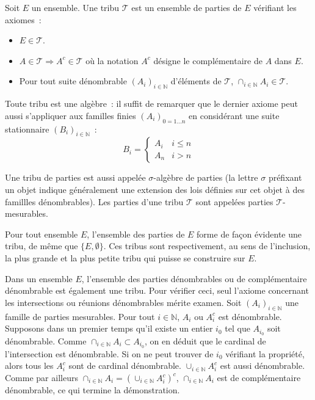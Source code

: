 \begin{mandatory}
\begin{defn}
Soit $E$ un ensemble. Une tribu $\mathcal{T}$ est un
ensemble de parties de $E$ vérifiant les axiomes~:
\begin{itemize}
\item $E \in \mathcal{T}$.
\item $A \in \mathcal{T} \Rightarrow A^c \in \mathcal{T}$ où la
  notation $A^c$ désigne le complémentaire de $A$ dans $E$.
\item Pour tout suite dénombrable $(A_i)_{i \in \mathbb{N}}$ d'éléments de
  $\mathcal{T}$, $\cap_{i \in \mathbb{N}}  A_i \in \mathcal{T}$.
\end{itemize}
\end{defn}
\end{mandatory}
Toute tribu est une algèbre~: il suffit de  remarquer que le dernier
axiome peut aussi s'appliquer aux familles finies $(A_i)_{0=1\dots n}$
en considérant une suite stationnaire $(B_i)_{i  \in \mathbb{N}}$~:
\[
B_i = \left \{ \begin{array}{cc}
A_i & i \leq n \\
A_n & i > n
\end{array} \right .
\]
\begin{term}
  Une tribu de parties est aussi appelée $\sigma$-algèbre de
parties (la lettre $\sigma$ préfixant un objet indique généralement une
extension des lois définies sur cet objet à des famillles dénombrables). Les
parties d'une tribu $\mathcal{T}$ sont appelées parties $\mathcal{T}$-mesurables.
\end{term}
\begin{exemple}
Pour tout ensemble $E$, l'ensemble des parties de $E$ forme de façon
évidente une tribu, de même que $\{E, \emptyset\}$. Ces
tribus sont respectivement, au sens de l'inclusion,  la plus grande et la plus petite tribu qui puisse se
construire sur $E$.
\end{exemple}
\begin{exemple}
Dans un ensemble $E$, l'ensemble des parties dénomb\-rables ou de
complémentaire dénombrable est également une tribu. Pour
vérifier ceci, seul l'axiome concernant les intersections ou
réunions dénombrables mérite examen. Soit $(A_i)_{i \in \mathbb{N}}$
une famille de parties mesurables. Pour tout $i \in \mathbb{N}$, $A_i$
ou $A_i^c$ est dénombrable. Supposons dans un premier temps qu'il
existe un entier $i_0$ tel que $A_{i_0}$ soit dénombrable. Comme
$\cap_{i \in \mathbb{N}} A_i \subset A_{i_0}$, on en déduit que le
cardinal de l'intersection est dénombrable. Si on ne peut trouver de
$i_0$ vérifiant la propriété, alors tous les $A_i^c$ sont de cardinal
dénombrable. $\cup_{i \in \mathbb{N}} A_i^c$ est aussi dénombrable. Comme par
ailleurs $\cap_{i \in \mathbb{N}} A_i = \left (\cup_{i \in \mathbb{N}}
A_i^c \right ) ^c$, $\cap_{i \in \mathbb{N}} A_i$ est de
complémentaire dénombrable, ce qui termine la démonstration.
\end{exemple}
